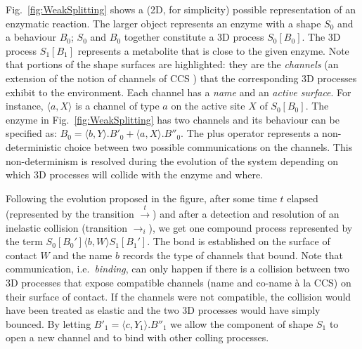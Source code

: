 \documentclass[11pt]{article}
\newcommand{\nar}[1]{\xrightarrow{#1}}
\newcommand{\inar}[1]{\xrightarrow{#1}_{i}}
\begin{document}
Fig.~\ref{fig:WeakSplitting} shows a (2D, for simplicity) possible representation of an enzymatic reaction. The larger object represents an enzyme with a shape $S_0$ and a behaviour $B_0$; $S_0$ and $B_0$ together constitute a 3D process $S_0[B_0]$. The 3D process $S_1[B_1]$ represents a metabolite that is close to the given enzyme. Note that portions of the shape surfaces are highlighted: they are the {\em channels} (an extension of the notion of channels of CCS \cite{Milner1989}) that the corresponding 3D processes exhibit to the environment. Each channel has a {\em name} and an {\em active surface}. For instance, $\langle a, X \rangle$ is a channel of type $a$ on the active site $X$ of $S_0[B_0]$. The enzyme in Fig.~\ref{fig:WeakSplitting} has two channels and its behaviour can be specified as: $B_0 = \langle b,Y \rangle . B'_0 + \langle a,X \rangle . B''_0$. The plus operator represents a non-deterministic choice between two possible communications on the channels. This non-determinism is resolved during the evolution of the system depending on which 3D processes will collide with the enzyme and where.

Following the evolution proposed in the figure, after some time $t$ elapsed (represented by the transition $\nar{t}$) and after a detection and resolution of an inelastic collision (transition $\inar{}$), we get one compound process represented by the term $S_0[B_0']\langle b, W \rangle S_1[B_1']$. The bond is established on the surface of contact $W$ and the name $b$ records the type of channels that bound. Note that communication, i.e.\ {\em binding}, can only happen if there is a collision between two 3D processes that expose compatible channels (name and co-name \`a la CCS) on their surface of contact. If the channels were not compatible, the collision would have been treated as elastic and the two 3D processes would have simply bounced. By letting $B'_1 = \langle c, Y_1 \rangle. B''_1$ we allow the component of shape $S_1$ to open a new channel and to bind with other colling processes.
\end{document}
